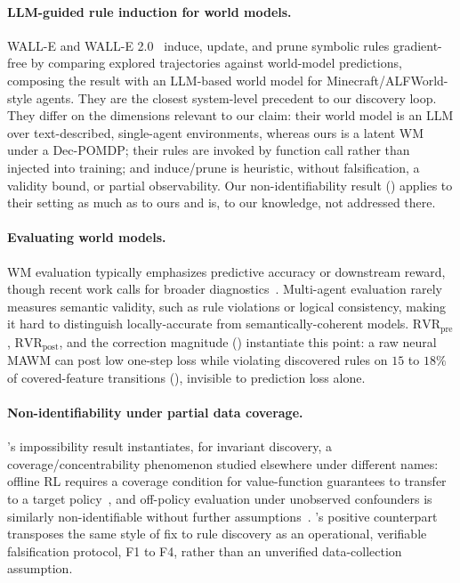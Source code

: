 \documentclass[letterpaper]{article} %
\let\autoref\Cref
\theoremstyle{plain}
\theoremstyle{definition}
\theoremstyle{remark}
\begin{document}
\paragraph{LLM-guided rule induction for world models.} WALL-E and WALL-E 2.0~\cite{zhou2024walle,zhou2025walle2} induce, update, and prune symbolic rules gradient-free by comparing explored trajectories against world-model predictions, composing the result with an LLM-based world model for Minecraft/ALFWorld-style agents. They are the closest system-level precedent to our discovery loop. They differ on the dimensions relevant to our claim: their world model is an LLM over text-described, single-agent environments, whereas ours is a latent WM under a Dec-POMDP; their rules are invoked by function call rather than injected into training; and induce/prune is heuristic, without falsification, a validity bound, or partial observability. Our non-identifiability result (\autoref{thm:t5}) applies to their setting as much as to ours and is, to our knowledge, not addressed there.

\paragraph{Evaluating world models.} WM evaluation typically emphasizes predictive accuracy or downstream reward, though recent work calls for broader diagnostics~\cite{Duan_2025_ICCV,Delvecchio2025p1157}. Multi-agent evaluation rarely measures semantic validity, such as rule violations or logical consistency, making it hard to distinguish locally-accurate from semantically-coherent models. $\mathrm{RVR}_{\mathrm{pre}}$, $\mathrm{RVR}_{\mathrm{post}}$, and the correction magnitude (\autoref{sec:injection}) instantiate this point: a raw neural MAWM can post low one-step loss while violating discovered rules on $15$ to $18\%$ of covered-feature transitions (\autoref{sec:exp-injection}), invisible to prediction loss alone.

\paragraph{Non-identifiability under partial data coverage.} \autoref{thm:t5}'s impossibility result instantiates, for invariant discovery, a coverage/concentrability phenomenon studied elsewhere under different names: offline RL requires a coverage condition for value-function guarantees to transfer to a target policy~\cite{chen2019information}, and off-policy evaluation under unobserved confounders is similarly non-identifiable without further assumptions~\cite{namkoong2020offpolicy}. \autoref{thm:t7}'s positive counterpart transposes the same style of fix to rule discovery as an operational, verifiable falsification protocol, F1 to F4, rather than an unverified data-collection assumption.
\end{document}
